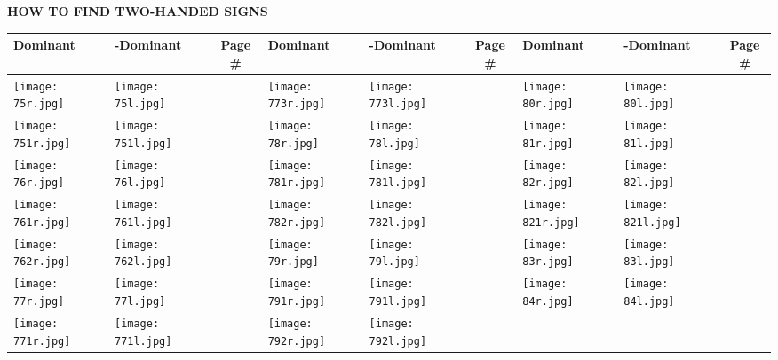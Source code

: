 \documentclass{tufte-book}
\begin{document}
\begin{fullwidth}

\label{page:twohandinfo}%
\begin{center}

{\large \textbf{HOW TO FIND TWO-HANDED SIGNS}}
\end{center}

\begin{table}[h!]
\begin{tabular}{!{\vrule width 3pt}l | l| c!{\vrule width 3pt} l | l| c!{\vrule width 3pt} l|l|c!{\vrule width 3pt}}
\hline
Dominant & -Dominant & Page \#& Dominant & -Dominant & Page \# & Dominant & -Dominant & Page \#\\
\hline
\texttt{[image: 75r.jpg]} & \texttt{[image: 75l.jpg]} & \pageref{page:75} & \texttt{[image: 773r.jpg]} & \texttt{[image: 773l.jpg]} & \pageref{page:773} & \texttt{[image: 80r.jpg]} & \texttt{[image: 80l.jpg]} & \pageref{page:80}\\\hline
\texttt{[image: 751r.jpg]} & \texttt{[image: 751l.jpg]} & \pageref{page:751} & \texttt{[image: 78r.jpg]} & \texttt{[image: 78l.jpg]} & \pageref{page:78} & \texttt{[image: 81r.jpg]} & \texttt{[image: 81l.jpg]} & \pageref{page:81}\\\hline
\texttt{[image: 76r.jpg]} & \texttt{[image: 76l.jpg]} & \pageref{page:76} & \texttt{[image: 781r.jpg]} & \texttt{[image: 781l.jpg]} & \pageref{page:781} & \texttt{[image: 82r.jpg]} & \texttt{[image: 82l.jpg]} & \pageref{page:82}\\\hline
\texttt{[image: 761r.jpg]} & \texttt{[image: 761l.jpg]} & \pageref{page:761} & \texttt{[image: 782r.jpg]} & \texttt{[image: 782l.jpg]} & \pageref{page:782} & \texttt{[image: 821r.jpg]} & \texttt{[image: 821l.jpg]} & \pageref{page:821}\\\hline
\texttt{[image: 762r.jpg]} & \texttt{[image: 762l.jpg]} & \pageref{page:762} & \texttt{[image: 79r.jpg]} & \texttt{[image: 79l.jpg]} & \pageref{page:79} & \texttt{[image: 83r.jpg]} & \texttt{[image: 83l.jpg]} & \pageref{page:83}\\\hline
\texttt{[image: 77r.jpg]} & \texttt{[image: 77l.jpg]} & \pageref{page:77} & \texttt{[image: 791r.jpg]} & \texttt{[image: 791l.jpg]} & \pageref{page:791} & \texttt{[image: 84r.jpg]} & \texttt{[image: 84l.jpg]} & \pageref{page:84}\\\hline
\texttt{[image: 771r.jpg]} & \texttt{[image: 771l.jpg]} & \pageref{page:771} & \texttt{[image: 792r.jpg]} & \texttt{[image: 792l.jpg]} & \pageref{page:792} & &  & \\\hline



\end{tabular}
\end{table}
\end{fullwidth}
\end{document}

